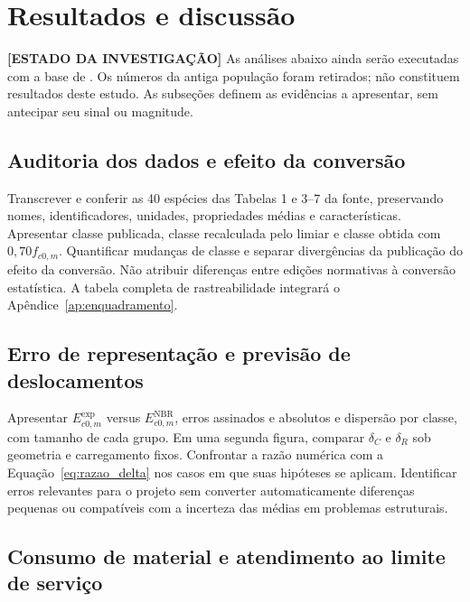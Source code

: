 \section{Resultados e discussão}\label{sec:results}

\begin{fillblock}
\noindent\textbf{[ESTADO DA INVESTIGAÇÃO]} As análises abaixo ainda serão executadas com a base de \textcite{DiasLahr2004}. Os números da antiga população foram retirados; não constituem resultados deste estudo. As subseções definem as evidências a apresentar, sem antecipar seu sinal ou magnitude.
\end{fillblock}

\subsection{Auditoria dos dados e efeito da conversão}\label{sec:auditoria}

\begin{fillblock}
Transcrever e conferir as 40 espécies das Tabelas 1 e 3--7 da fonte, preservando nomes, identificadores, unidades, propriedades médias e características. Apresentar classe publicada, classe recalculada pelo limiar e classe obtida com $0{,}70f_{c0,m}$. Quantificar mudanças de classe e separar divergências da publicação do efeito da conversão. Não atribuir diferenças entre edições normativas à conversão estatística. A tabela completa de rastreabilidade integrará o Apêndice~\ref{ap:enquadramento}.
\end{fillblock}

\subsection{Erro de representação e previsão de deslocamentos}\label{sec:erro_deslocamento}

\begin{fillblock}
Apresentar $E_{c0,m}^{\mathrm{exp}}$ versus $E_{c0,m}^{\mathrm{NBR}}$, erros assinados e absolutos e dispersão por classe, com tamanho de cada grupo. Em uma segunda figura, comparar $\delta_C$ e $\delta_R$ sob geometria e carregamento fixos. Confrontar a razão numérica com a Equação~\ref{eq:razao_delta} nos casos em que suas hipóteses se aplicam. Identificar erros relevantes para o projeto sem converter automaticamente diferenças pequenas ou compatíveis com a incerteza das médias em problemas estruturais.
\end{fillblock}

\subsection{Consumo de material e atendimento ao limite de serviço}\label{sec:custo_enquadramento}

